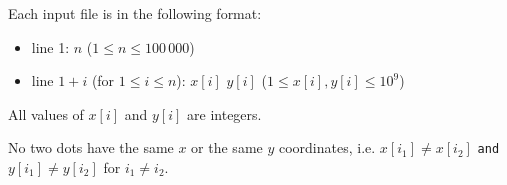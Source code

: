 Each input file is in the following format:
\begin{itemize}
\item line 1: $n$ ($1 \leq n \leq 100\,000$)
\item line $1+i$ (for $1 \leq i \leq n$): $x[i]$ $y[i]$ ($1 \leq x[i], y[i] \leq {10}^9$)
\end{itemize}

All values of $x[i]$ and $y[i]$ are integers.

No two dots have the same $x$ or the same $y$ coordinates, i.e. $x[i_1] \neq x[i_2]$ \texttt{and} $y[i_1] \neq y[i_2]$ for $i_1 \neq i_2$.